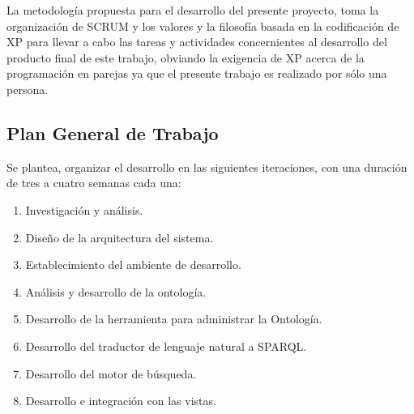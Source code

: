 La metodología propuesta para el desarrollo del presente proyecto, toma la organización de SCRUM y los valores y la filosofía basada en la codificación de XP para llevar a cabo las tareas y actividades concernientes al desarrollo del producto final de este trabajo, obviando la exigencia de XP acerca de la programación en parejas ya que el presente trabajo es realizado por sólo una persona.

\subsection{Plan General de Trabajo}
Se plantea, organizar el desarrollo en las siguientes iteraciones, con una duración de tres a cuatro semanas cada una:

\begin{enumerate}
\item Investigación y análisis.
\item Diseño de la arquitectura del sistema.
\item Establecimiento del ambiente de desarrollo.
\item Análisis y desarrollo de la ontología.
\item Desarrollo de la herramienta para administrar la Ontología.
\item Desarrollo del traductor de lenguaje natural a SPARQL.
\item Desarrollo del motor de búsqueda.
\item Desarrollo e integración con las vistas.
\end{enumerate}

\newpage

